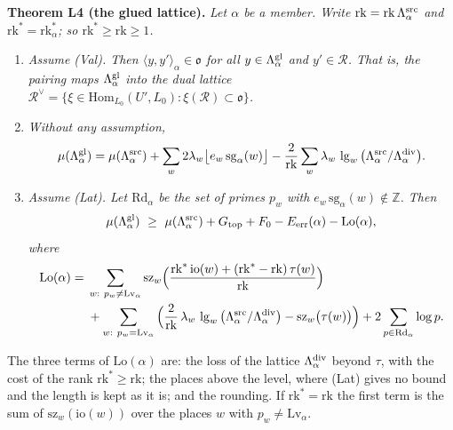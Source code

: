 \documentclass[11pt,letterpaper]{article}
\newcommand{\Z}{\mathbb Z}\newcommand{\Q}{\mathbb Q}\newcommand{\C}{\mathbb C}
\begin{document}
\textbf{Theorem L4 (the glued lattice).} \emph{Let $\alpha$ be a member. Write
$\mathrm{rk}=\mathrm{rk}\,\Lambda^{\rm src}_\alpha$ and $\mathrm{rk}^*=\mathrm{rk}^*_\alpha$; so
$\mathrm{rk}^*\ge\mathrm{rk}\ge1$.}
\begin{enumerate}[label=\textup{(\roman*)},leftmargin=2.4em,itemsep=1pt,topsep=2pt]
\item \emph{Assume \textup{(Val)}. Then $\langle y,y'\rangle_\alpha\in\mathfrak o$ for all
$y\in\Lambda^{\rm gl}_\alpha$ and $y'\in\mathcal R$. That is, the pairing maps $\Lambda^{\rm gl}_\alpha$
into the dual lattice $\mathcal R^\vee=\{\xi\in\mathrm{Hom}_{L_0}(U',L_0):
\xi(\mathcal R)\subset\mathfrak o\}$.}
\item \emph{Without any assumption,}
\begin{equation}\label{lt:mueq}
 \mu(\Lambda^{\rm gl}_\alpha)=\mu(\Lambda^{\rm src}_\alpha)
   +\sum_w2\lambda_w\big\lfloor e_w\,\mathrm{sg}_\alpha(w)\big\rfloor
   -\frac2{\mathrm{rk}}\sum_w\lambda_w\,\lg_w\big(\Lambda^{\rm src}_\alpha/\Lambda^{\rm div}_\alpha\big).
\end{equation}
\item \emph{Assume \textup{(Lat)}. Let $\mathrm{Rd}_\alpha$ be the set of primes $p_w$ with
$e_w\,\mathrm{sg}_\alpha(w)\notin\Z$. Then}
\begin{equation}\label{lt:slope}
 \mu(\Lambda^{\rm gl}_\alpha)\ \ge\ \mu(\Lambda^{\rm src}_\alpha)+G_{\rm top}+F_0-E_{\rm err}(\alpha)-\mathrm{Lo}(\alpha),
\end{equation}
\emph{where}
\begin{equation}\label{lt:Lodef}
\begin{aligned}
 \mathrm{Lo}(\alpha)={}&\sum_{w:\ p_w\ne\mathrm{Lv}_\alpha}
   \mathrm{sz}_w\Big(\frac{\mathrm{rk}^*\,\mathrm{io}(w)+(\mathrm{rk}^*-\mathrm{rk})\,\tau(w)}{\mathrm{rk}}\Big)\\
 &+\sum_{w:\ p_w=\mathrm{Lv}_\alpha}\Big(\frac2{\mathrm{rk}}\,\lambda_w\,
   \lg_w\big(\Lambda^{\rm src}_\alpha/\Lambda^{\rm div}_\alpha\big)-\mathrm{sz}_w\big(\tau(w)\big)\Big)
   +2\sum_{p\in\mathrm{Rd}_\alpha}\log p .
\end{aligned}
\end{equation}
\end{enumerate}
The three terms of $\mathrm{Lo}(\alpha)$ are: the loss of the lattice $\Lambda^{\rm div}_\alpha$ beyond
$\tau$, with the cost of the rank $\mathrm{rk}^*\ge\mathrm{rk}$; the places above the level, where
\textup{(Lat)} gives no bound and the length is kept as it is; and the rounding. If
$\mathrm{rk}^*=\mathrm{rk}$ the first term is the sum of $\mathrm{sz}_w(\mathrm{io}(w))$ over the places $w$ with $p_w\ne\mathrm{Lv}_\alpha$.
\end{document}

